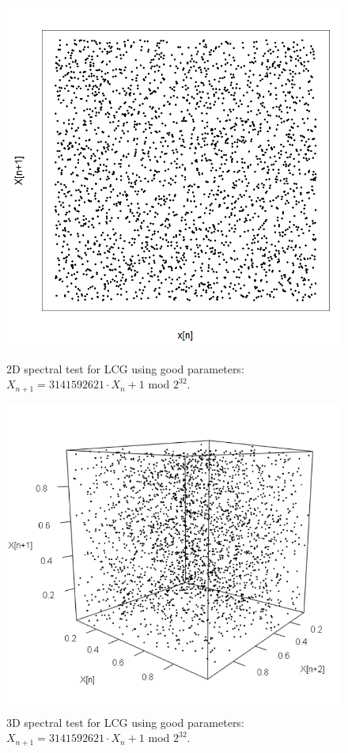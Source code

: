 \begin{figure}
	\centering
	\begin{minipage}{0.45\textwidth}
		\centering
		\includegraphics[width=\linewidth]{billder/spec_good_lcg_2d.png}
		\caption{2D spectral test for LCG using good parameters: $X_{n+1}=3 141 592 621\cdot X_{n}+1$ mod $2^{32}$.}
		\label{fig:goodspec2d}
	\end{minipage}\hfill
	\begin{minipage}{0.45\textwidth}
		\centering
		\includegraphics[width=\linewidth]{billder/spec_good_lcg_3d.png}
		\caption{3D spectral test for LCG using good parameters: $X_{n+1}=3 141 592 621\cdot X_{n}+1$ mod $2^{32}$.}
		\label{fig:goodspec3d}
	\end{minipage}
\end{figure}

